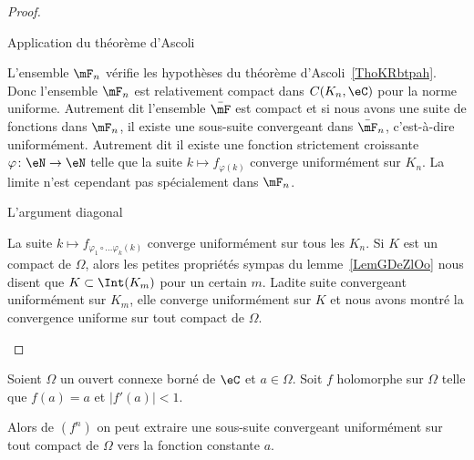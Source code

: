 \begin{proof}
\begin{subproof}
    \item[Application du théorème d'Ascoli]

        L'ensemble \( \mF_n\) vérifie les hypothèses du théorème d'Ascoli~\ref{ThoKRbtpah}. Donc l'ensemble \( \mF_n\) est relativement compact dans \( C(K_n,\eC)\) pour la norme uniforme. Autrement dit l'ensemble \( \bar\mF\) est compact et si nous avons une suite de fonctions dans \( \mF_n\), il existe une sous-suite convergeant dans \( \bar\mF_n\), c'est-à-dire uniformément. Autrement dit il existe une fonction strictement croissante \( \varphi\colon \eN\to \eN\) telle que la suite \( k\mapsto f_{\varphi(k)}\) converge uniformément sur \( K_n\). La limite n'est cependant pas spécialement dans \( \mF_n\).

    \item[L'argument diagonal]

        La suite \( k\mapsto f_{\varphi_1\circ\ldots\varphi_k(k)}\) converge uniformément sur tous les \( K_n\). Si \( K\) est un compact de \( \Omega\), alors les petites propriétés sympas du lemme~\ref{LemGDeZlOo} nous disent que \( K\subset \Int(K_m)\) pour un certain \( m\). Ladite suite convergeant uniformément sur \( K_m\), elle converge uniformément sur \( K\) et nous avons montré la convergence uniforme sur tout compact de \( \Omega\).

    \end{subproof}
\end{proof}

\begin{corollary}
    Soient \( \Omega\) un ouvert connexe borné de \( \eC\) et \( a\in \Omega\). Soit \( f\) holomorphe sur \( \Omega\) telle que \( f(a)=a\) et \( | f'(a) |<1\).

    Alors de \( (f^n)\) on peut extraire une sous-suite convergeant uniformément sur tout compact de \( \Omega\) vers la fonction constante \( a\).
\end{corollary}

